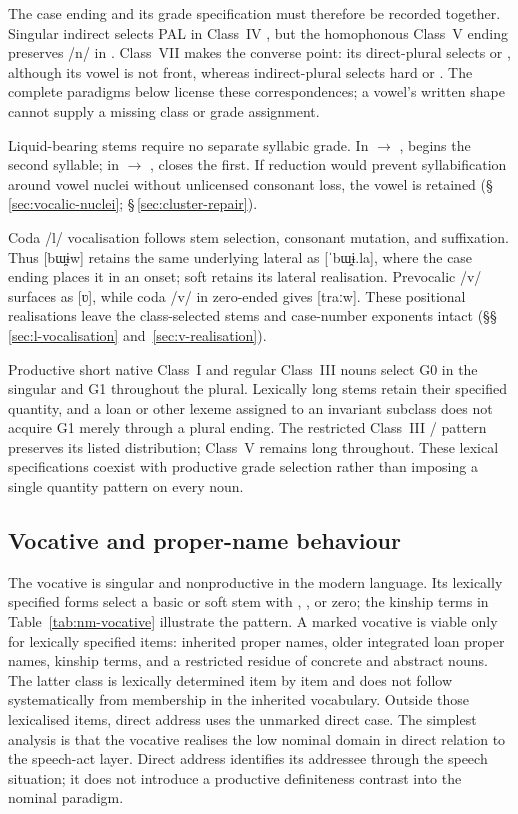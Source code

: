 The case ending and its grade specification must therefore be recorded
together. Singular indirect  selects PAL in Class~IV ,
but the homophonous Class~V ending preserves /n/ in .
Class~VII makes the converse point: its direct-plural  selects
 or , although its vowel is not front, whereas
indirect-plural  selects hard  or .
The complete paradigms below license these correspondences; a vowel's written
shape cannot supply a missing class or grade assignment.

Liquid-bearing stems require no separate syllabic grade. In 
$\rightarrow$ ,  begins the second syllable; in
 $\rightarrow$ ,  closes the first.
If reduction would prevent syllabification around vowel nuclei without
unlicensed consonant loss, the vowel is retained
(§\,\ref{sec:vocalic-nuclei}; §\,\ref{sec:cluster-repair}).

Coda /l/ vocalisation follows stem selection, consonant mutation, and
suffixation. Thus  [bɯ̯ɨw] retains the same underlying lateral as
 [ˈbɯ̯ɨ.la], where the case ending places it in an onset; soft
 retains its lateral realisation. Prevocalic /v/ surfaces as [ʋ],
while coda /v/ in zero-ended  gives [traːw]. These positional
realisations leave the class-selected stems and case-number exponents intact
(§§\,\ref{sec:l-vocalisation} and~\ref{sec:v-realisation}).

Productive short native Class~I and regular Class~III nouns select G0 in the
singular and G1 throughout the plural. Lexically long stems retain their
specified quantity, and a loan or other lexeme assigned to an invariant
subclass does not acquire G1 merely through a plural ending. The restricted
Class~III / pattern preserves its listed distribution;
Class~V  remains long throughout. These lexical specifications
coexist with productive grade selection rather than imposing a single
quantity pattern on every noun.

\subsection{Vocative and proper-name behaviour}
\label{sec:nm-vocative}

The vocative is singular and nonproductive in the modern language. Its
lexically specified forms select a basic or soft stem with ,
, or zero; the kinship terms in Table~\ref{tab:nm-vocative}
illustrate the  pattern. A marked vocative is viable only for
lexically specified items: inherited proper names, older integrated loan proper
names, kinship terms, and a restricted residue of concrete and abstract nouns.
The latter class is lexically determined item by item and does not follow
systematically from membership in the inherited vocabulary. Outside those
lexicalised items, direct address uses the unmarked direct case.
The simplest analysis is that the vocative realises the low nominal domain in
direct relation to the speech-act layer. Direct address identifies its
addressee through the speech situation; it does not introduce a productive
definiteness contrast into the nominal paradigm.

